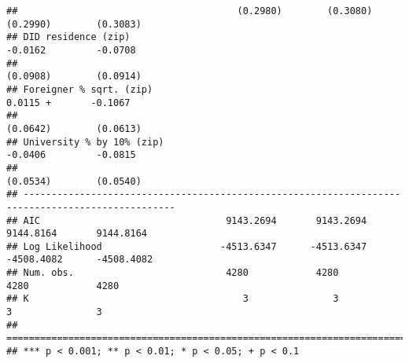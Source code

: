 \documentclass[
]{article}
\begin{document}
\begin{verbatim}
##                                       (0.2980)        (0.3080)        (0.2990)        (0.3083)   
## DID residence (zip)                                                   -0.0162         -0.0708    
##                                                                       (0.0908)        (0.0914)   
## Foreigner % sqrt. (zip)                                                0.0115 +       -0.1067    
##                                                                       (0.0642)        (0.0613)   
## University % by 10% (zip)                                             -0.0406         -0.0815    
##                                                                       (0.0534)        (0.0540)   
## -------------------------------------------------------------------------------------------------
## AIC                                 9143.2694       9143.2694       9144.8164       9144.8164    
## Log Likelihood                     -4513.6347      -4513.6347      -4508.4082      -4508.4082    
## Num. obs.                           4280            4280            4280            4280         
## K                                      3               3               3               3         
## =================================================================================================
## *** p < 0.001; ** p < 0.01; * p < 0.05; + p < 0.1
\end{verbatim}
\end{document}
